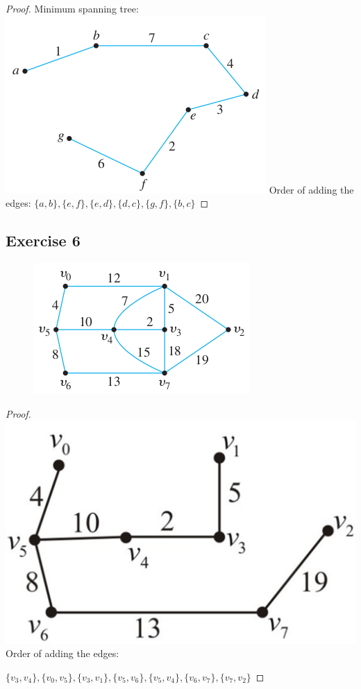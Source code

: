 \documentclass[14pt]{extarticle}
\begin{document}
\begin{proof}
Minimum spanning tree: 
\includegraphics[scale=0.5]{../images/10.6.5.2.png}
Order of adding the edges: \(\{a, b\}, \{e, f\}, \{e, d\}, \{d, c\}, \{g, f\}, \{b, c\}\)
\end{proof}

\subsection{Exercise 6}
\begin{figure}[ht!]
\centering
\includegraphics[scale=0.5]{../images/10.6.6.png} 
\end{figure}

\begin{proof}
\includegraphics[scale=0.2]{../images/10.6.6.2.png} Order of adding the edges: 

\(\{v_3, v_4\}, \{v_0, v_5\}, \{v_3, v_1\}, \{v_5, v_6\}, \{v_5, v_4\}, \{v_6, v_7\}, \{v_7, v_2\}\)
\end{proof}
\end{document}
